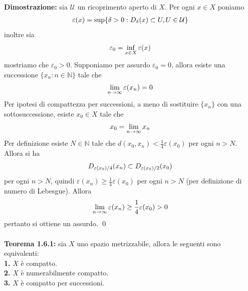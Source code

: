 \documentclass{article}
\begin{document}
\textbf{Dimostrazione:} sia $\mathcal{U}$ un ricoprimento aperto di $X$. Per ogni $x \in X$ poniamo 
\begin{align}
    \varepsilon(x) = \sup\{\delta > 0 : D_\delta(x) \subset U, U \in \mathcal{U}\} \notag
\end{align}
inoltre sia 
\begin{align}
    \varepsilon_0 = \inf_{x \in X}\varepsilon(x) \notag
\end{align}
mostriamo che $\varepsilon_0 > 0$. Supponiamo per assurdo $\varepsilon_0 = 0$, allora esiste una successione $\{x_n : n  \in \mathbb{N}\}$ tale che 
\begin{align}
    \lim_{n \rightarrow \infty}\varepsilon(x_n) = 0 \notag
\end{align}
Per ipotesi di compattezza per successioni, a meno di sostituire $\{x_n\}$ con una sottosuccessione, esiste $x_0 \in X$ tale che 
\begin{align}
    x_0 = \lim_{n \rightarrow \infty}x_n \notag
\end{align}
Per definizione esiste $N \in \mathbb{N}$ tale che $d(x_0, x_n) < \frac{1}{4}\varepsilon(x_0)$ per ogni $n > N$. Allora si ha 
\begin{align}
    D_{\varepsilon(x_0)/4}(x_n) \subset D_{\varepsilon(x_0)/2}(x_0) \notag
\end{align}
per ogni $n > N$, quindi $\varepsilon(x_n) \geq \frac{1}{4}\varepsilon(x_0)$ per ogni $n > N$ (per definizione di numero di Lebesgue). Allora 
\begin{align}
    \lim_{n \rightarrow \infty}\varepsilon(x_n) \geq \frac{1}{4}\varepsilon(x_0) > 0 \notag
\end{align}
pertanto si ottiene un assurdo. \qed \\ \\
\textbf{Teorema 1.6.1:} sia $X$ uno spazio metrizzabile, allora le seguenti sono equivalenti: \\
\textbf{1.} $X$ è compatto. \\
\textbf{2.} $X$ è numerabilmente compatto. \\
\textbf{3.} $X$ è compatto per successioni. \\
\end{document}
